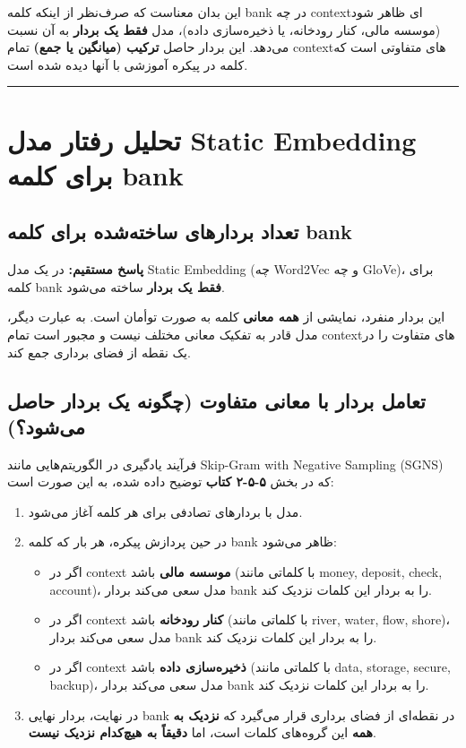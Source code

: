 \documentclass[11pt,a4paper]{article}
\newcommand{\en}[1]{\textenglish{#1}}
\newcommand{\thickseparator}{\vspace{1em}\noindent\rule{\linewidth}{1pt}\vspace{1em}}
\begin{document}
این بدان معناست که صرف‌نظر از اینکه کلمه \en{bank} در چه \en{context}ای ظاهر شود (موسسه مالی، کنار رودخانه، یا ذخیره‌سازی داده)، مدل \textbf{فقط یک بردار} به آن نسبت می‌دهد. این بردار حاصل \textbf{ترکیب (میانگین یا جمع)} تمام \en{context}‌های متفاوتی است که کلمه در پیکره آموزشی با آنها دیده شده است.

\thickseparator

\section{تحلیل رفتار مدل \en{Static Embedding} برای کلمه \en{bank}}

\subsection{تعداد بردارهای ساخته‌شده برای کلمه \en{bank}}
\textbf{پاسخ مستقیم:} در یک مدل \en{Static Embedding} (چه \en{Word2Vec} و چه \en{GloVe})، برای کلمه \en{bank} \textbf{فقط یک بردار} ساخته می‌شود.

این بردار منفرد، نمایشی از \textbf{همه معانی} کلمه به صورت توأمان است. به عبارت دیگر، مدل قادر به تفکیک معانی مختلف نیست و مجبور است تمام \en{context}‌های متفاوت را در یک نقطه از فضای برداری جمع کند.

\subsection{تعامل بردار با معانی متفاوت (چگونه یک بردار حاصل می‌شود؟)}
فرآیند یادگیری در الگوریتم‌هایی مانند \en{Skip-Gram with Negative Sampling (SGNS)} که در بخش \textbf{\en{۵-۵-۲} کتاب} توضیح داده شده، به این صورت است:

\begin{enumerate}
    \item مدل با بردارهای تصادفی برای هر کلمه آغاز می‌شود.
    \item در حین پردازش پیکره، هر بار که کلمه \en{bank} ظاهر می‌شود:
    \begin{itemize}
        \item اگر در \en{context} \textbf{موسسه مالی} باشد (با کلماتی مانند \en{money, deposit, check, account})، مدل سعی می‌کند بردار \en{bank} را به بردار این کلمات نزدیک کند.
        \item اگر در \en{context} \textbf{کنار رودخانه} باشد (با کلماتی مانند \en{river, water, flow, shore})، مدل سعی می‌کند بردار \en{bank} را به بردار این کلمات نزدیک کند.
        \item اگر در \en{context} \textbf{ذخیره‌سازی داده} باشد (با کلماتی مانند \en{data, storage, secure, backup})، مدل سعی می‌کند بردار \en{bank} را به بردار این کلمات نزدیک کند.
    \end{itemize}
    \item در نهایت، بردار نهایی \en{bank} در نقطه‌ای از فضای برداری قرار می‌گیرد که \textbf{نزدیک به همه} این گروه‌های کلمات است، اما \textbf{دقیقاً به هیچ‌کدام نزدیک نیست}.
\end{enumerate}
\end{document}
